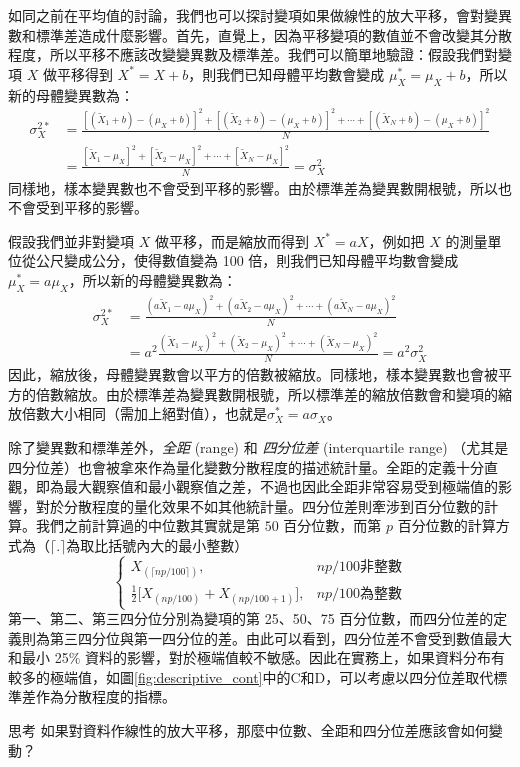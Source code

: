    如同之前在平均值的討論，我們也可以探討變項如果做線性的放大平移，會對變異數和標準差造成什麼影響。首先，直覺上，因為平移變項的數值並不會改變其分散程度，所以平移不應該改變變異數及標準差。我們可以簡單地驗證：假設我們對變項 $X$ 做平移得到 $X^* = X+b$，則我們已知母體平均數會變成 $\mu_X^* = \mu_X+b$，所以新的母體變異數為：
    \begin{align*}
        \sigma^{2*}_X &= \frac{[(\tilde{X}_1+b)-(\mu_X+b)]^2+[(\tilde{X}_2+b)-(\mu_X+b)]^2+\cdots+[(\tilde{X}_N+b)-(\mu_X+b)]^2}{N} \\
        &= \frac{[\tilde{X}_1-\mu_X]^2+[\tilde{X}_2-\mu_X]^2+\cdots+[\tilde{X}_N-\mu_X]^2}{N} = \sigma_X^2
    \end{align*}
    同樣地，樣本變異數也不會受到平移的影響。由於標準差為變異數開根號，所以也不會受到平移的影響。

    假設我們並非對變項 $X$ 做平移，而是縮放而得到 $X^* = aX$，例如把 $X$ 的測量單位從公尺變成公分，使得數值變為 100 倍，則我們已知母體平均數會變成 $\mu_X^* = a\mu_X$，所以新的母體變異數為：
    \begin{align*}
        \sigma^{2*}_X &= \frac{(a\tilde{X}_1-a\mu_X)^2+(a\tilde{X}_2-a\mu_X)^2+\cdots+(a\tilde{X}_N-a\mu_X)^2}{N} \\
        &= a^2\frac{(\tilde{X}_1-\mu_X)^2+(\tilde{X}_2-\mu_X)^2+\cdots+(\tilde{X}_N-\mu_X)^2}{N} = a^2\sigma_X^2
    \end{align*}
    因此，縮放後，母體變異數會以平方的倍數被縮放。同樣地，樣本變異數也會被平方的倍數縮放。由於標準差為變異數開根號，所以標準差的縮放倍數會和變項的縮放倍數大小相同（需加上絕對值），也就是$\sigma^*_X = a\sigma_X$。

    除了變異數和標準差外，\textit{全距} (range) 和 \textit{四分位差} (interquartile range) （尤其是四分位差）也會被拿來作為量化變數分散程度的描述統計量。全距的定義十分直觀，即為最大觀察值和最小觀察值之差，不過也因此全距非常容易受到極端值的影響，對於分散程度的量化效果不如其他統計量。四分位差則牽涉到百分位數的計算。我們之前計算過的中位數其實就是第 $50$ 百分位數，而第 $p$ 百分位數的計算方式為（$\lceil.\rceil$為取比括號內大的最小整數）
    \[\left\{\begin{array}{lr}
        X_{(\lceil np/100 \rceil)}, & np/100 \text{非整數}\\
        \frac{1}{2}\Big[X_{(np/100)}+X_{(np/100+1)}\Big], & np/100 \text{為整數}
    \end{array}\right.\]
    第一、第二、第三四分位分別為變項的第 25、50、75 百分位數，而四分位差的定義則為第三四分位與第一四分位的差。由此可以看到，四分位差不會受到數值最大和最小 25$\%$ 資料的影響，對於極端值較不敏感。因此在實務上，如果資料分布有較多的極端值，如圖\ref{fig:descriptive_cont}中的C和D，可以考慮以四分位差取代標準差作為分散程度的指標。

    \begin{custom}{思考}
        如果對資料作線性的放大平移，那麼中位數、全距和四分位差應該會如何變動？
    \end{custom}
